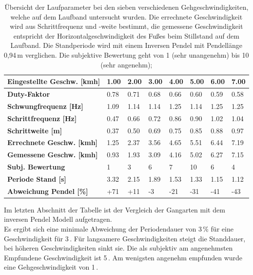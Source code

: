 \begin{table}[h!]
	\centering
	\caption[Abgeleitete Größen]{Übersicht der Laufparameter bei den sieben verschiedenen Gehgeschwindigkeiten, welche auf dem Laufband untersucht wurden. Die errechnete Geschwindigkeit wird aus Schrittfrequenz und -weite bestimmt, die gemessene Geschwindigkeit entspricht der Horizontalgeschwindigkeit des Fußes beim Stillstand auf dem Laufband. Die Standperiode wird mit einem Inversen Pendel mit Pendellänge 0,94\,m verglichen. Die subjektive Bewertung geht von 1 (sehr unangenehm) bis 10 (sehr angenehm);}
	\label{tab:laufband}
	\begin{tabular}{L{5.5cm}C{0.9cm}C{0.9cm}C{0.9cm}C{0.9cm}C{0.9cm}C{0.9cm}C{0.9cm}}
		\toprule
		\textbf{Eingestellte Geschw. [kmh]} & 1.00 & 2.00 & 3.00 & 4.00 & 5.00 & 6.00 & 7.00\\
		\midrule 
		\textbf{Duty-Faktor} 		& 0.78 & 0.71 & 0.68 & 0.66 & 0.60 & 0.59 & 0.58 \\
		\textbf{Schwungfrequenz [Hz]} & 1.09 & 1.14 & 1.14 & 1.25 & 1.14 & 1.25 & 1.25 \\
		\textbf{Schrittfrequenz [Hz]} & 0.47 & 0.66 & 0.72 & 0.86 & 0.90 & 1.02 & 1.04 \\
		\textbf{Schrittweite [m] }& 0.37 & 0.50 & 0.69 & 0.75 & 0.85 & 0.88 & 0.97 \\
		\midrule
		\textbf{Errechnete Geschw. [kmh]} & 1.25 & 2.37 & 3.56 & 4.65 & 5.51 & 6.44 & 7.19 \\
		\textbf{Gemessene Geschw. [kmh]} & 0.93 & 1.93 & 3.09 & 4.16 & 5.02 & 6.27 & 7.15 \\
		\midrule
		\textbf{Subj. Bewertung } & 1 & 3 & 6 & 7 & 10 & 6 & 4 \\
		 \textbf{Periode Stand [s]} &  3.32 &  2.15 &  1.89 & 1.53 &  1.33 &  1.15 & 1.12 \\
		\textbf{Abweichung Pendel [\%]}  & +71 & +11 & -3 & -21 & -31 & -41 & -43 \\
		\bottomrule
	\end{tabular}
\end{table}

Im letzten Abschnitt der Tabelle ist der Vergleich der Gangarten mit dem inversen Pendel Modell aufgetragen.\\ 
Es ergibt sich eine minimale Abweichung der Periodendauer von 3\,\%{} für eine Geschwindigkeit für 3\,\kmh. Für langsamere Geschwindigkeiten steigt die Standdauer, bei höheren Geschwindigkeiten sinkt sie. Die als subjektiv am angenehmsten Empfundene Geschwindigkeit ist 5\,\kmh. Am wenigsten angenehm empfunden wurde eine Gehgeschwindigkeit von 1\,\kmh. 

